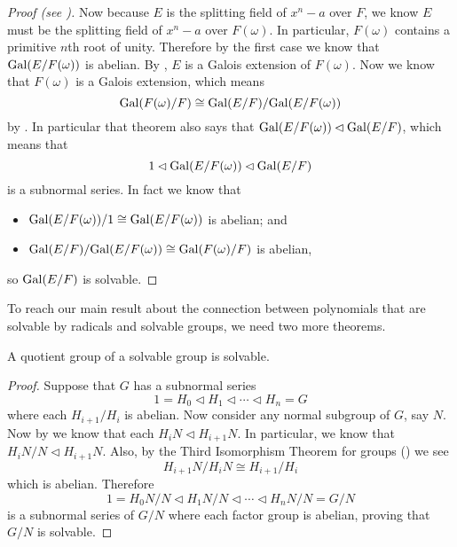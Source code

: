 \begin{proof}[Proof (see {\cite[Theorem 32.2]{gallian_2016}})]
    Now because $E$ is the splitting field of $x^n - a$ over $F$, we know $E$ must be the splitting field of $x^n - a$ over $F(\omega)$. In particular, $F(\omega)$ contains a primitive $n$th root of unity. Therefore by the first case we know that $\mathrm{Gal}(E/F(\omega))$ is abelian. By , $E$ is a Galois extension of $F(\omega)$. Now we know that $F(\omega)$ is a Galois extension, which means
    \[
        \mathrm{Gal}(F(\omega)/F) \cong \mathrm{Gal}(E/F)/\mathrm{Gal}(E/F(\omega))
    \]
    by . In particular that theorem also says that $\mathrm{Gal}(E/F(\omega)) \lhd \mathrm{Gal}(E/F)$, which means that
    \[
        1 \lhd \mathrm{Gal}(E/F(\omega)) \lhd \mathrm{Gal}(E/F)
    \]
    is a subnormal series. In fact we know that
    \begin{itemize}
        \item $\mathrm{Gal}(E/F(\omega))/1 \cong \mathrm{Gal}(E/F(\omega))$ is abelian; and
        \item $\mathrm{Gal}(E/F)/\mathrm{Gal}(E/F(\omega)) \cong \mathrm{Gal}(F(\omega)/F)$ is abelian,
    \end{itemize}
    so $\mathrm{Gal}(E/F)$ is solvable.
\end{proof}

To reach our main result about the connection between polynomials that are solvable by radicals and solvable groups, we need two more theorems.

\begin{theorem}\label{thrm-quotient-group-of-solvable-group-is-solvable}
    A quotient group of a solvable group is solvable.
\end{theorem}
\begin{proof}
    Suppose that $G$ has a subnormal series
    \[
        1 = H_0 \lhd H_1 \lhd \cdots \lhd H_n = G
    \]
    where each $H_{i+1}/H_i$ is abelian. Now consider any normal subgroup of $G$, say $N$. Now by  we know that each $H_iN \lhd H_{i+1}N$. In particular, we know that $H_iN/N \lhd H_{i+1}N$. Also, by the Third Isomorphism Theorem for groups () we see
    \[
        H_{i+1}N / H_iN \cong H_{i+1}/H_i
    \]
    which is abelian. Therefore
    \[
        1 = H_0N/N \lhd H_1N/N \lhd \cdots \lhd H_nN/N = G/N
    \]
    is a subnormal series of $G/N$ where each factor group is abelian, proving that $G/N$ is solvable.
\end{proof}

